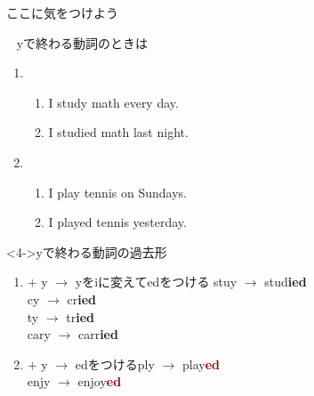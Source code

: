 \documentclass[aspectratio=169,xcolor={dvipsnames,table}]{beamer}
\begin{document}
\begin{frame}[plain]{ここに気をつけよう}
 
\dbend\,\,\,\,\,yで終わる動詞のときは

\begin{enumerate}
 \item<1-> \begin{enumerate}
	\item<1-> I study math every day.
	\item<2-> I studied math last night.
       \end{enumerate}
 \item<1-> \begin{enumerate}
	\item<1-> I play tennis on Sundays.
	\item<3-> I played tennis yesterday.
       \end{enumerate}
\end{enumerate}

\begin{block}<4->{yで終わる動詞の過去形}\small
 \begin{enumerate}
  \item<5->  $+$ y $\longrightarrow$ yをiに変えてedをつける%
\hfill{}stuy $\rightarrow$ stud\textcolor{NavyBlue}{\bfseries ied}\\
\hfill{}cy $\rightarrow$ cr\textcolor{NavyBlue}{\bfseries ied}\\
\hfill{}ty $\rightarrow$ tr\textcolor{NavyBlue}{\bfseries ied}\\
\hfill{}cary $\rightarrow$ carr\textcolor{NavyBlue}{\bfseries ied}
  \item<6->  $+$ y $\longrightarrow$ edをつける\hfill{}ply $\rightarrow$ play\textcolor{Maroon}{\bfseries ed}\\
\hfill{}enjy $\rightarrow$ enjoy\textcolor{Maroon}{\bfseries ed}
 \end{enumerate}
\end{block}
\end{frame}

\end{document}
